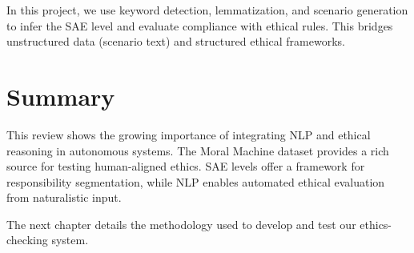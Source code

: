 In this project, we use keyword detection, lemmatization, and scenario generation to infer the SAE level and evaluate compliance with ethical rules. This bridges unstructured data (scenario text) and structured ethical frameworks.

\section{Summary}

This review shows the growing importance of integrating NLP and ethical reasoning in autonomous systems. The Moral Machine dataset provides a rich source for testing human-aligned ethics. SAE levels offer a framework for responsibility segmentation, while NLP enables automated ethical evaluation from naturalistic input.

The next chapter details the methodology used to develop and test our ethics-checking system.

